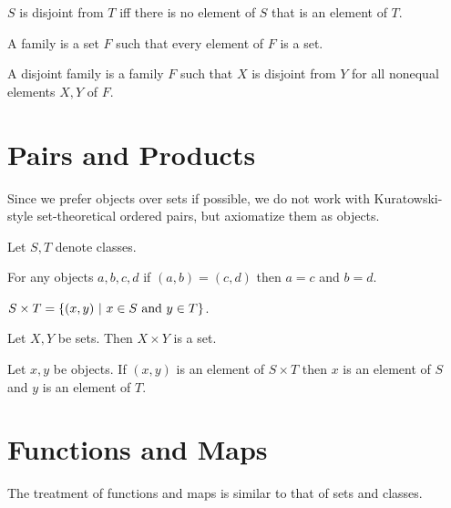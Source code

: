 \documentclass[11pt]{article}
\begin{document}
\begin{forthel}
  \begin{definition}
    $S$ is disjoint from $T$ iff there is no element of $S$ that is an element
    of $T$.
  \end{definition}

  \begin{definition}
    A family is a set $F$ such that every element of $F$ is a set.
  \end{definition}

  \begin{definition}
    A disjoint family is a family $F$ such that $X$ is disjoint from $Y$ for all
    nonequal elements $X, Y$ of $F$.
  \end{definition}
\end{forthel}


\section{Pairs and Products}

Since we prefer objects over sets if possible, we do not work
with Kuratowski-style set-theoretical ordered pairs, but
axiomatize them as objects.

\begin{forthel}
  Let $S, T$ denote classes.

  \begin{axiom}
    For any objects $a, b, c, d$ if $(a,b) = (c,d)$ then $a = c$ and $b = d$.
  \end{axiom}

  \begin{definition}
    $S \times T = \class{(x,y) | \text{$x \in S$ and $y \in T$}}$.
  \end{definition}

  \begin{axiom}
    Let $X, Y$ be sets.
    Then $X \times Y$ is a set.
  \end{axiom}

  \begin{lemma}
    Let $x, y$ be objects.
    If $(x,y)$ is an element of $S \times T$ then $x$ is an element of $S$ and
    $y$ is an element of $T$.
  \end{lemma}
\end{forthel}


\section{Functions and Maps}

The treatment of functions and maps is similar to that
of sets and classes.
\end{document}
